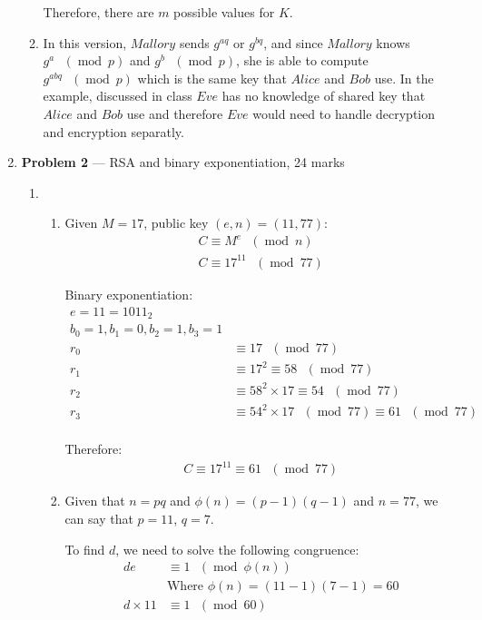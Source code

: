 \documentclass[11pt]{article}
\theoremstyle{definition}
\renewcommand{\pmod}[1]{\mbox{\ $(\ensuremath{\operatorname{mod}}\ {#1})$}}
\newcommand{\A}{Alice}
\newcommand{\B}{Bob}
\newcommand{\E}{Eve}
\newcommand{\M}{Mallory}
\begin{document}
\begin{enumerate}
\begin{enumerate}
    Therefore, there are $m$ possible values for $K$.
  \item
    In this version, $\M$ sends $g^{aq}$ or $g^{bq}$, and since $\M$ knows $g^{a} \pmod{p}$ and $g^{b} \pmod{p}$, she is able to compute $g^{abq} \pmod{p}$ which is the same key that $\A$ and $\B$ use. In the example, discussed in class $\E$  has no knowledge of shared key that $\A$ and $\B$ use and therefore $\E$ would need to handle decryption and encryption separatly.
\end{enumerate}

\newpage

\item[] \textbf{Problem 2} --- RSA and binary exponentiation, 24 marks

\begin{enumerate}
  \item
    \begin{enumerate}
      \item 
        Given $M = 17$, public key $(e, n) = (11, 77)$:
        \begin{align*}
          C \equiv M^e \pmod{n} \\
          C \equiv 17^{11} \pmod{77}
        \end{align*}

        Binary exponentiation:
        \begin{align*}
          e = 11 = 1011_{2} \\
          b_0 = 1, b_1 = 0, b_2 = 1, b_3 = 1 \\
          r_0 &\equiv 17 \pmod{77} \\
          r_1 &\equiv 17^2 \equiv 58 \pmod{77} \\
          r_2 &\equiv 58^2 \times 17 \equiv 54 \pmod{77}  \\
          r_3 &\equiv 54^2 \times 17 \pmod{77} \equiv 61 \pmod{77}  \\
        \end{align*}

        Therefore:
        \begin{align*}
          C \equiv 17^{11} \equiv 61 \pmod{77}
        \end{align*}
      \item
        Given that $n = pq$ and $\phi{(n)} = (p - 1)(q - 1)$ and $n = 77$, we can say that $p = 11$, $q = 7$.

        To find $d$, we need to solve the following congruence:
        \begin{align*}
          de &\equiv 1 \pmod{\phi{(n)}} \\
             &\text{Where } \phi{(n)} = (11 - 1)(7 - 1) = 60 \\
          d \times 11 &\equiv 1 \pmod{60}
        \end{align*}


\end{enumerate}
\end{enumerate}
\end{enumerate}
\end{document}
